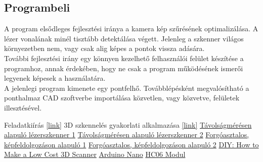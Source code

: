 \documentclass[12pt,a4paper]{article}
\begin{document}
\subsection{Programbeli}
A program elsődleges fejlesztési iránya a kamera kép szűrésének optimalizálása. A lézer vonalának minél tisztább detektálása végett. Jelenleg a szkenner világos környezetben nem, vagy csak alig képes a pontok vissza adására.
\\[10pt]
További fejlesztési irány egy könnyen kezelhető felhasználói felület készítése a programhoz, annak érdekében, hogy ne csak a program működésének ismerői legyenek képesek a használatára.
\\[10pt]
A jelenlegi program kimenete egy pontfelhő. Továbblépésként megvalósítható a ponthalmaz CAD szoftverbe importálása közvetlen, vagy közvetve, felületek illesztésével.
\newpage
\begin{thebibliography}{9} 
	
Feladatkiírás
\href{http://mogi.bme.hu/letoltes/MECHATRONIKAI%20&%20IR%C3%81NY%C3%8DT%C3%81STECHNIKAI%20T%C3%81RGYAK/MECHATRONIKA_PROJEKT_BMEGEFOAMM3/Feladatlapok_M/}
{[link]}
3D szkennelés gyakorlati alkalmazása
\href{https://www.artec3d.com/applications}{[link]}
\href{http://lanmarservices.com/wp-content/uploads/2014/04/Faro_Building_Scan.jpg}{Távolságmérésen alapuló lézerszkenner 1}
\href{https://i1.wp.com/cmfenews.com/wp-content/uploads/2018/04/3D-Laser.jpg?fit=1600%2C1200&ssl=1}{Távolságmérésen alapuló lézerszkenner 2}
\href{https://i.ytimg.com/vi/RVgyyIlQydg/maxresdefault.jpg}{Forgóasztalos, képfeldolgozáson alapuló 1}
\href{https://3dprint.com/wp-content/uploads/2015/03/Fig.-1-New-Perceptron-Smart3D-Laser-Scanning-System-3.jpg}{Forgóasztalos, képfeldolgozáson alapuló 2}
\href{http://www.instructables.com/id/3D-Laser-Scanning-DIY/}{DIY: How to Make a Low Cost 3D Scanner}
\href{https://potentiallabs.com/cart/image/cache/catalog/New%20Components/Nano_1-800x800.jpg}{Arduino Nano}
\href{http://www.robotistan.com/hc06-serial-port-bluetooth-module-12526-82-B.jpg}{HC06 Modul}

\end{thebibliography}
\end{document}
